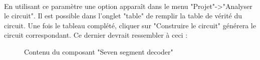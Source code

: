 \documentclass{article}
\begin{document}
    \paragraph{}
    En utilisant ce paramètre une option apparaît dans le menu "Projet"->"Analyser le circuit".
    Il est possible dans l'onglet "table" de remplir la table de vérité du circuit.
    Une fois le tableau complété, cliquer sur "Construire le circuit" générera le circuit correspondant.
    Ce dernier devrait ressembler à ceci :
    \begin{figure}[H]
        \caption{Contenu du composant "Seven segment decoder"}
    \end{figure}
\end{document}
